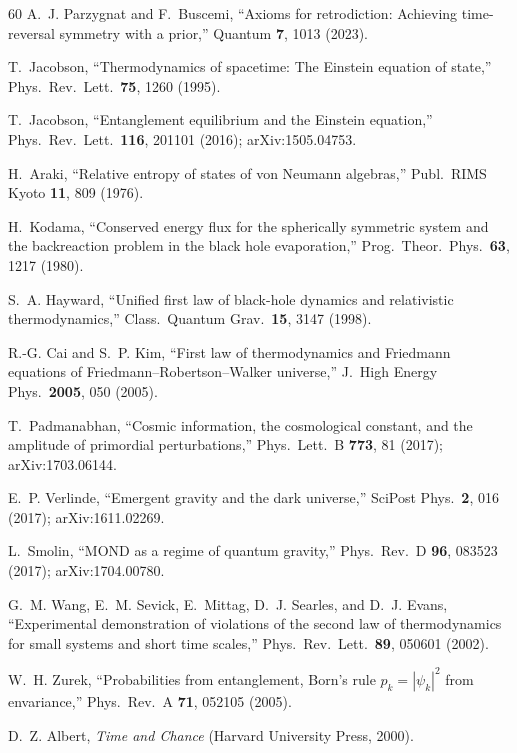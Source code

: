 \documentclass[prl,twocolumn,superscriptaddress,longbibliography,floatfix]{revtex4-2}
\begin{document}
\begin{thebibliography}{60}
A.~J. Parzygnat and F.~Buscemi,
``Axioms for retrodiction: Achieving time-reversal symmetry with a
prior,''
Quantum \textbf{7}, 1013 (2023).

T.~Jacobson,
``Thermodynamics of spacetime: The Einstein equation of state,''
Phys.\ Rev.\ Lett.\ \textbf{75}, 1260 (1995).

T.~Jacobson,
``Entanglement equilibrium and the Einstein equation,''
Phys.\ Rev.\ Lett.\ \textbf{116}, 201101 (2016);
arXiv:1505.04753.

H.~Araki,
``Relative entropy of states of von Neumann algebras,''
Publ.\ RIMS Kyoto \textbf{11}, 809 (1976).

H.~Kodama,
``Conserved energy flux for the spherically symmetric system and
the backreaction problem in the black hole evaporation,''
Prog.\ Theor.\ Phys.\ \textbf{63}, 1217 (1980).

S.~A. Hayward,
``Unified first law of black-hole dynamics and relativistic
thermodynamics,''
Class.\ Quantum Grav.\ \textbf{15}, 3147 (1998).

R.-G. Cai and S.~P. Kim,
``First law of thermodynamics and Friedmann equations of
Friedmann--Robertson--Walker universe,''
J.\ High Energy Phys.\ \textbf{2005}, 050 (2005).

T.~Padmanabhan,
``Cosmic information, the cosmological constant, and the
amplitude of primordial perturbations,''
Phys.\ Lett.\ B \textbf{773}, 81 (2017);
arXiv:1703.06144.

E.~P. Verlinde,
``Emergent gravity and the dark universe,''
SciPost Phys.\ \textbf{2}, 016 (2017); arXiv:1611.02269.

L.~Smolin,
``MOND as a regime of quantum gravity,''
Phys.\ Rev.\ D \textbf{96}, 083523 (2017);
arXiv:1704.00780.

G.~M. Wang, E.~M. Sevick, E.~Mittag, D.~J. Searles,
and D.~J. Evans,
``Experimental demonstration of violations of the second law
of thermodynamics for small systems and short time scales,''
Phys.\ Rev.\ Lett.\ \textbf{89}, 050601 (2002).

W.~H. Zurek,
``Probabilities from entanglement, Born's rule
$p_k = |\psi_k|^2$ from envariance,''
Phys.\ Rev.\ A \textbf{71}, 052105 (2005).

D.~Z. Albert,
\emph{Time and Chance}
(Harvard University Press, 2000).


\end{thebibliography}
\end{document}
